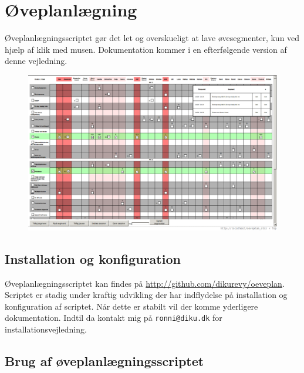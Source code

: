 \documentclass{article}
\begin{document}
\section{Øveplanlægning}
Øveplanlægningsscriptet gør det let og overskueligt at lave
øvesegmenter, kun ved hjælp af klik med musen. 
  Dokumentation kommer i en
efterfølgende version af denne vejledning. 
\begin{figure}[H]
\begin{center}
\includegraphics[width=\textwidth]{oveplan-example}
\end{center}
\end{figure}
\subsection{Installation og konfiguration}
Øveplanlægningsscriptet kan findes på
\url{http://github.com/dikurevy/oeveplan}. Scriptet er stadig under
kraftig udvikling der har indflydelse på installation og konfiguration
af scriptet. Når dette er stabilt vil der komme yderligere dokumentation. Indtil da
kontakt mig på \texttt{ronni@diku.dk} for installationsvejledning.
\subsection{Brug af øveplanlægningsscriptet}
\end{document}

